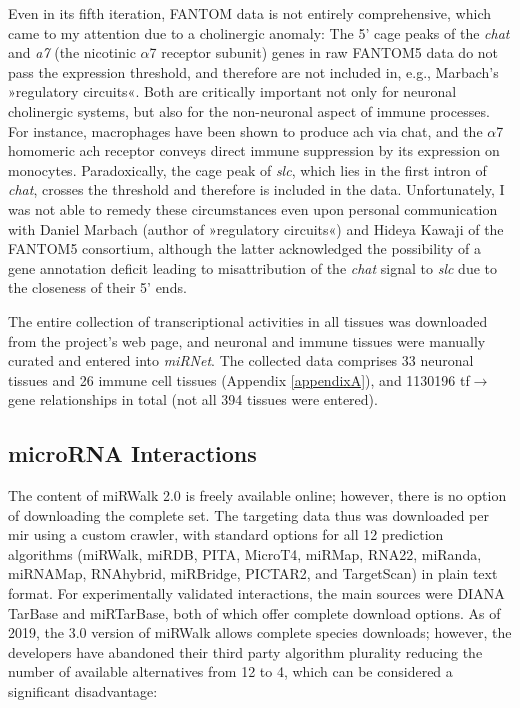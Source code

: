 Even in its fifth iteration, FANTOM data is not entirely comprehensive, which came to my attention due to a cholinergic anomaly: The 5' \ac{cage} peaks of the \textit{\ac{chat}} and \textit{\acs{a7}} (the nicotinic $\alpha$7 receptor subunit) genes in raw FANTOM5 data do not pass the expression threshold, and therefore are not included in, e.g., Marbach's »regulatory circuits«. Both are critically important not only for neuronal cholinergic systems, but also for the non-neuronal aspect of immune processes. For instance, macrophages have been shown to produce \ac{ach} via \ac{chat}, and the $\alpha$7 homomeric \ac{ach} receptor conveys direct immune suppression by its expression on monocytes\cite{Fujii2017}. Paradoxically, the \ac{cage} peak of \textit{\ac{slc}}, which lies in the first intron of \textit{\ac{chat}}, crosses the threshold and therefore is included in the data. Unfortunately, I was not able to remedy these circumstances even upon personal communication with Daniel Marbach (author of »regulatory circuits«) and Hideya Kawaji of the FANTOM5 consortium, although the latter acknowledged the possibility of a gene annotation deficit leading to misattribution of the \textit{\ac{chat}} signal to \textit{\ac{slc}} due to the closeness of their 5' ends.

The entire collection of transcriptional activities in all tissues was downloaded from the project's web page\cite{Marbach2016}, and neuronal and immune tissues were manually curated and entered into \textit{miRNet}. The collected data comprises 33 neuronal tissues and 26 immune cell tissues (Appendix \ref{appendixA}), and \num{1130196} \ac{tf}$\to$gene relationships in total (not all 394 tissues were entered). 

\subsection{microRNA Interactions} \label{sec:database:mirna}
The content of miRWalk 2.0 is freely available online\cite{miRWalk2}; however, there is no option of downloading the complete set. The targeting data thus was downloaded per \ac{mir} using a custom crawler, with standard options for all 12 prediction algorithms (miRWalk, miRDB, PITA, MicroT4, miRMap, RNA22, miRanda, miRNAMap, RNAhybrid, miRBridge, PICTAR2, and TargetScan) in plain text format. For experimentally validated interactions, the main sources were DIANA TarBase\cite{Karagkouni2018} and miRTarBase\cite{Chou2018}, both of which offer complete download options. As of 2019, the 3.0 version of miRWalk allows complete species downloads; however, the developers have abandoned their third party algorithm plurality reducing the number of available alternatives from 12 to 4, which can be considered a significant disadvantage:

